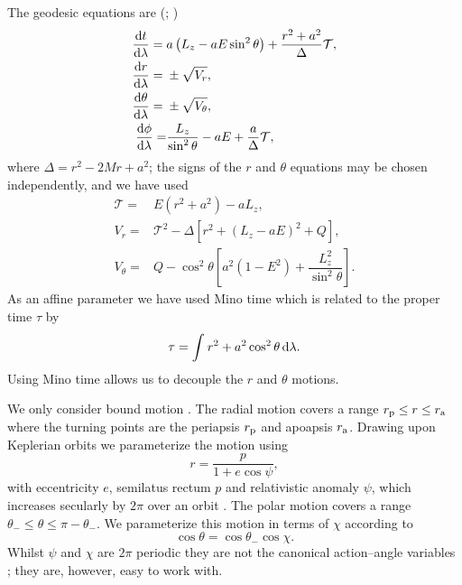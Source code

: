 The geodesic equations are (\citealt{Carter1968}; \citealt[section 62]{Chandrasekhar1992})
\begin{subequations}
\begin{align}
\dfrac{\mathrm{d} {t}}{\mathrm{d} {\lambda}} = {} & a\left(L_z - aE\sin^2 \theta\right) + \dfrac{r^2 + a^2}{\Delta}\mathcal{T},\\
\dfrac{\mathrm{d} {r}}{\mathrm{d} {\lambda}} = {} & \pm \sqrt{V_r},\\
\dfrac{\mathrm{d} {\theta}}{\mathrm{d} {\lambda}} = {} & \pm \sqrt{V_\theta},\\
\dfrac{\mathrm{d} {\phi}}{\mathrm{d} {\lambda}}  = & \dfrac{L_z}{\sin^2 \theta} - aE + \dfrac{a}{\Delta}\mathcal{T},
\end{align}
\end{subequations}
where $\Delta = r^2 - 2M r + a^2$; the signs of the $r$ and $\theta$ equations may be chosen independently, and we have used
\begin{subequations}
\begin{align}
\mathcal{T} = {} & E\left(r^2 +a^2\right) - aL_z,\\
V_r = {} & \mathcal{T}^2 - \Delta\left[r^2 + \left(L_z -aE\right)^2 + Q\right],\\
V_\theta = {} & Q - \cos^2 \theta\left[a^2\left(1 - E^2\right) + \dfrac{L_z^2}{\sin^2\theta}\right].
\end{align}
\end{subequations}
As an affine parameter we have used Mino time which is related to the proper time $\tau$ by \citep{Mino2003}
\begin{equation}
\tau = \int_{}^{}{r^2 + a^2 \cos^2\theta}\,\mathrm{d}{\lambda}.
\end{equation}
Using Mino time allows us to decouple the $r$ and $\theta$ motions.

We only consider bound motion \citep{Wilkins1972}. The radial motion covers a range $r_\mathrm{p} \leq r \leq r_\mathrm{a}$ where the turning points are the periapsis $r_\mathrm{p}$ and apoapsis $r_\mathrm{a}$. Drawing upon Keplerian orbits we parameterize the motion using
\begin{equation}
r = \dfrac{p}{1+e\cos\psi},
\end{equation}
with eccentricity $e$, semilatus rectum $p$ and relativistic anomaly $\psi$, which increases secularly by $2\pi$ over an orbit  \citep{Darwin1961,Drasco2004}. The polar motion covers a range $\theta_- \leq \theta \leq \pi - \theta_-$. We parameterize this motion in terms of $\chi$ according to \citep{Hughes2000}
\begin{equation}
\cos\theta = \cos\theta_-\cos\chi.
\end{equation}
Whilst $\psi$ and $\chi$ are $2\pi$ periodic they are not the canonical action--angle variables \citep{Schmidt2002}; they are, however, easy to work with.

